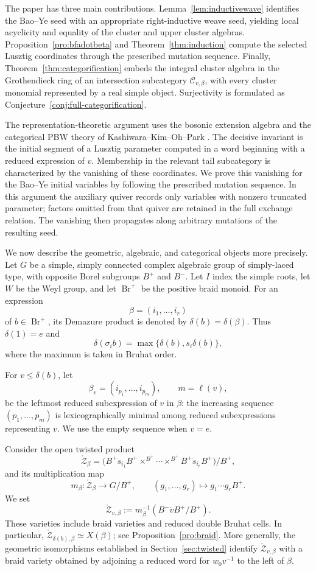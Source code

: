 \documentclass[12pt, reqno]{amsart}
\theoremstyle{plain}
\theoremstyle{definition}
\numberwithin{equation}{section}
\begin{document}
The paper has three main contributions. Lemma~\ref{lem:inductivewave}
identifies the Bao--Ye seed with an appropriate right-inductive weave
seed, yielding local acyclicity and equality of the cluster and upper
cluster algebras. Proposition~\ref{pro:bfadotbeta} and
Theorem~\ref{thm:induction} compute the selected Lusztig coordinates
through the prescribed mutation sequence. Finally,
Theorem~\ref{thm:categorification} embeds the integral cluster algebra
in the Grothendieck ring of an intersection subcategory
$\mathscr C_{v,\beta}$, with every cluster monomial represented by a
real simple object. Surjectivity is formulated as
Conjecture~\ref{conj:full-categorification}.

The representation-theoretic argument uses the bosonic extension
algebra and the categorical PBW theory of Kashiwara--Kim--Oh--Park
\cite{kashiwara2024braid,kashiwara2025global,kashiwara2025monoidal}.
The decisive invariant is the initial segment of a Lusztig parameter
computed in a word beginning with a reduced expression of $v$.
Membership in the relevant tail subcategory is characterized by the
vanishing of these coordinates. We prove this vanishing for the
Bao--Ye initial variables by following the prescribed mutation
sequence. In this argument the auxiliary quiver records only variables
with nonzero truncated parameter; factors omitted from that quiver are
retained in the full exchange relation. The vanishing then propagates
along arbitrary mutations of the resulting seed.

We now describe the geometric, algebraic, and categorical objects more
precisely. Let $G$ be a simple, simply connected complex algebraic group
of simply-laced type, with opposite Borel subgroups $B^+$ and $B^-$.
Let $I$ index the simple roots, let $W$ be the Weyl group, and let
$\operatorname{Br}^+$ be the positive braid monoid. For an expression
\[
\beta=(i_1,\ldots,i_r)
\]
of $b\in\operatorname{Br}^+$, its Demazure product is denoted by
$\delta(b)=\delta(\beta)$. Thus $\delta(1)=e$ and
\[
\delta(\sigma_i b)=\max\{\delta(b),s_i\delta(b)\},
\]
where the maximum is taken in Bruhat order.

For $v\le\delta(b)$, let
\[
\beta_v=(i_{p_1},\ldots,i_{p_m}),\qquad m=\ell(v),
\]
be the leftmost reduced subexpression of $v$ in $\beta$: the increasing
sequence $(p_1,\ldots,p_m)$ is lexicographically minimal among reduced
subexpressions representing $v$. We use the empty sequence when $v=e$.

Consider the open twisted product
\[
\mathring{\mathcal Z}_\beta
=
\bigl(B^+\dot s_{i_1}B^+\times^{B^+}\cdots
\times^{B^+}B^+\dot s_{i_r}B^+\bigr)/B^+,
\]
and its multiplication map
\[
m_\beta:\mathring{\mathcal Z}_\beta\longrightarrow G/B^+,
\qquad (g_1,\ldots,g_r)\longmapsto g_1\cdots g_rB^+.
\]
We set
\[
\mathring{\mathcal Z}_{v,\beta}
:=m_\beta^{-1}(B^-\dot vB^+/B^+).
\]
These varieties include braid varieties and reduced double Bruhat
cells. In particular,
$\mathring{\mathcal Z}_{\delta(b),\beta}\simeq X(\beta)$;
see Proposition~\ref{pro:braid}. More generally, the geometric
isomorphisms established in Section~\ref{sec:twisted} identify
$\mathring{\mathcal Z}_{v,\beta}$ with a braid variety obtained by
adjoining a reduced word for $w_0v^{-1}$ to the left of $\beta$.
\end{document}
